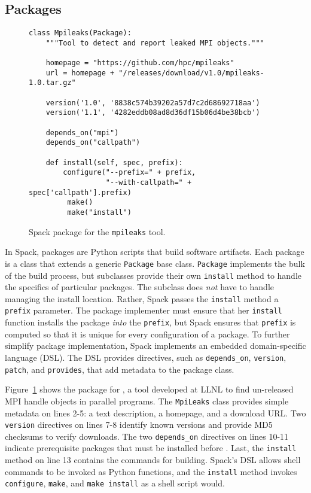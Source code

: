 
\subsection{Packages}\label{sec:packages}

\begin{figure}
\begin{verbatim}
class Mpileaks(Package):
    """Tool to detect and report leaked MPI objects."""

    homepage = "https://github.com/hpc/mpileaks"
    url = homepage + "/releases/download/v1.0/mpileaks-1.0.tar.gz"

    version('1.0', '8838c574b39202a57d7c2d68692718aa')
    version('1.1', '4282eddb08ad8d36df15b06d4be38bcb')

    depends_on("mpi")
    depends_on("callpath")

    def install(self, spec, prefix):
        configure("--prefix=" + prefix,
                  "--with-callpath=" + spec['callpath'].prefix)
         make()
         make("install")
\end{verbatim}
	\caption{
		Spack package for the {\tt mpileaks} tool.
		\label{fig:mpileaks}
	}
\end{figure}

In Spack, packages are Python scripts that build software artifacts.
Each package is a class that extends a generic {\tt Package}
base class.  {\tt Package} implements the bulk of the build process, but
subclasses provide their own {\tt install} method to handle the
specifics of particular packages. The subclass does {\it not} have to
handle managing the install location.  Rather, Spack passes the {\tt install}
method a {\tt prefix} parameter.  The package implementer must ensure that
her {\tt install} function installs the package {\it into} the {\tt prefix},
but Spack ensures that {\tt prefix} is computed so that it is
unique for every configuration of a package.  To further simplify
package implementation, Spack implements an embedded domain-specific
language (DSL).
The DSL provides directives, such as {\tt depends\_on},
{\tt version}, {\tt patch}, and {\tt provides}, that add metadata
to the package class.

Figure~\ref{fig:mpileaks} shows the package for \mpileaks, a tool developed
at LLNL to find un-released MPI handle objects in parallel programs.
The {\tt MpiLeaks} class provides simple metadata on lines 2-5: a text
description, a homepage, and a download URL.
Two {\tt version} directives on lines 7-8 identify known versions and provide
MD5 checksums to verify downloads.
The two {\tt depends\_on} directives on lines 10-11 indicate prerequisite
packages that must be installed before \mpileaks.
Last, the {\tt install} method on line 13 contains the commands for building.
Spack's DSL allows shell commands to be invoked as Python functions,
and the {\tt install} method invokes {\tt configure},
{\tt make}, and {\tt make install} as a shell script would.
